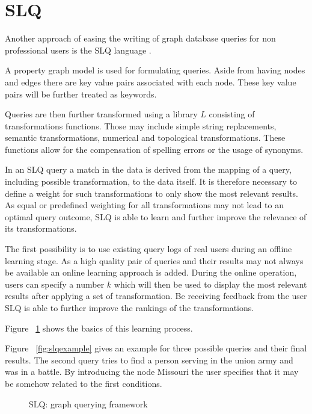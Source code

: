 \documentclass{sig-alternate}
\begin{document}
\section{SLQ}
Another approach of easing the writing of graph database queries for non
professional users is the SLQ language \cite{yang2014schemaless} \cite{yang2014slq}. 

A property graph model is used for formulating queries. Aside
from having nodes and edges there are key value pairs associated with
each node. These key value pairs will be further treated as keywords.

Queries are then further transformed using a library $L$ consisting of transformations
functions. Those may include simple string replacements, semantic transformations,
numerical and topological transformations.
These functions allow for the compensation of spelling errors or the
usage of synonyms.

In an SLQ query a match in the data is derived from the mapping
of a query, including possible transformation, to the data itself. It is therefore necessary 
to define a weight for such transformations to only show the most relevant results.
As equal or predefined weighting for all transformations may not lead to an optimal 
query outcome, SLQ is able to learn and further improve the relevance of its transformations.

The first possibility is to use existing query logs of real users during an offline learning stage.
As a high quality pair of queries and their results may not always be available an online learning approach
is added. During the online operation, users can specify a number $k$ which will then be used
to display the most relevant results after applying a set of transformation. Be receiving 
feedback from the user SLQ is able to further improve the rankings of the transformations.

Figure ~\ref{fig:slqlearning} shows the basics of this learning process.

Figure ~\ref{fig:slqexample} gives an example for three possible queries and their final results.
The second query tries to find a person serving in the union army and was in a battle. By introducing 
the node Missouri the user specifies that it may be somehow related to the first conditions.

\begin{figure}
\centering
{}
\caption{SLQ: graph querying framework}
\label{fig:slqlearning}
\end{figure}
\end{document}
